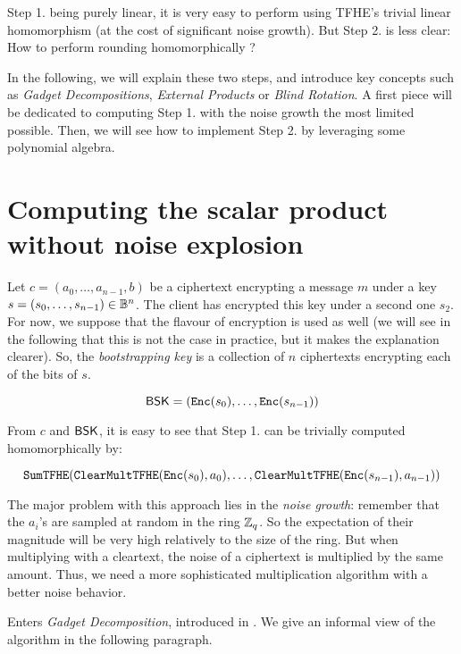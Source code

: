 Step 1. being purely linear, it is very easy to perform using TFHE's trivial linear homomorphism (at the cost of significant noise growth). But Step 2. is less clear: How to perform rounding homomorphically ? 

In the following, we will explain these two steps, and introduce key concepts such as \textit{Gadget Decompositions}, \textit{External Products} or \textit{Blind Rotation}. A first piece will be dedicated to computing Step 1. with the noise growth the most limited possible. Then, we will see how to implement Step 2. by leveraging some polynomial algebra.

\section{Computing the scalar product without noise explosion}

Let $c = (a_0, \dots, a_{n-1}, b)$ be a \LWE ciphertext encrypting a message $m$ under a key $s = (s_0, \dots, s_{n-1}) \in \mathbb{B}^n$. The client has encrypted this key under a second one $s_2$. For now, we suppose that the \LWE flavour of encryption is used as well (we will see in the following that this is not the case in practice, but it makes the explanation clearer). So, the \textit{bootstrapping key} is a collection of $n$ ciphertexts encrypting each of the bits of $s$.

\begin{equation}
	\textsf{BSK} = \left ( \texttt{Enc}(s_0), \dots, \texttt{Enc}(s_{n-1}) \right )
\end{equation}



From $c$ and $\textsf{BSK}$, it is easy to see that Step 1. can be trivially computed homomorphically by:

\begin{equation*}
	\texttt{SumTFHE}(\texttt{ClearMultTFHE}(\texttt{Enc}(s_0), a_0), \dots, \texttt{ClearMultTFHE}(\texttt{Enc}(s_{n-1}), a_{n-1}))
\end{equation*}


The major problem with this approach lies in the \textit{noise growth}: remember that the $a_i$'s are sampled at random in the ring $\mathbb{Z}_q$. So the expectation of their magnitude will be very high relatively to the size of the ring. But when multiplying with a cleartext, the noise of a ciphertext is multiplied by the same amount. Thus, we need a more sophisticated multiplication algorithm with a better noise behavior.

Enters \textit{Gadget Decomposition}, introduced in \cite{GSW13}. We give an informal view of the algorithm in the following paragraph.


